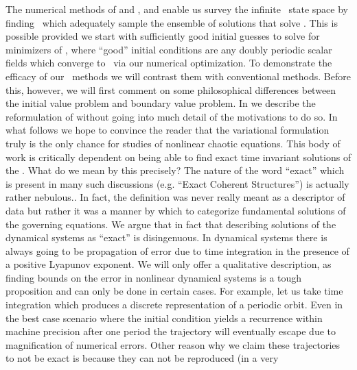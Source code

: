 

The numerical methods of  and
, and 
enable us survey the infinite \spt\ state space by
finding \twots\ which adequately sample the ensemble of
solutions
that solve .
This is possible provided we start with sufficiently good
initial guesses to solve for minimizers of ,
where ``good'' initial conditions are any doubly periodic scalar fields
which converge to \twots\ via our numerical optimization.
To demonstrate the efficacy of our \spt\ methods we will
contrast them with conventional methods. Before this, however,
we will first comment on some philosophical differences between
the initial value problem and boundary value problem.
In  we describe the reformulation
of  without going into much detail of the motivations
to do so. In what follows we hope to convince the reader that
the variational formulation truly is the only chance for studies
of nonlinear chaotic equations.
This body of work is critically dependent
on being able to find exact time invariant solutions of the \KSe.
What do we mean by this precisely?
The nature of the word ``exact'' which is present in many such
discussions (e.g. ``Exact Coherent Structures'')
is actually rather nebulous..
In fact, the definition was never really meant as a descriptor
of data but rather it was a manner by which to categorize
fundamental solutions of the governing equations.
We argue that in fact that describing solutions of
the dynamical systems as ``exact'' is disingenuous. In dynamical
systems there is always going to be propagation of error
due to time integration in the presence of a positive Lyapunov
exponent. We will only offer a qualitative description, as
finding bounds on the error in nonlinear dynamical systems
is a tough proposition and can only be done in certain cases.
For example, let us take time integration which produces a discrete
representation of a periodic orbit. Even in the best case
scenario where the initial condition yields a
recurrence within machine precision after one period
the trajectory will eventually escape due to magnification
of numerical errors. Other reason why we claim these trajectories
to not be exact is because they can not be reproduced (in a very
